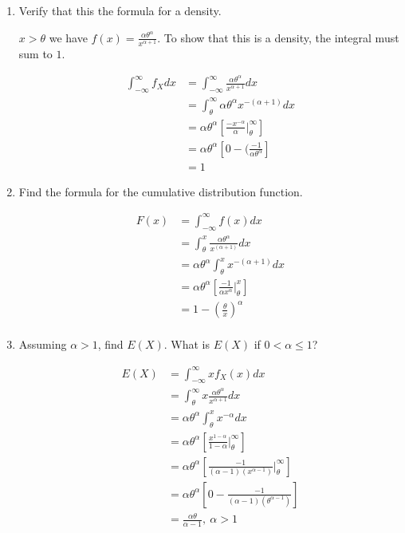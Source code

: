 \documentclass{tufte-book}
\theoremstyle{mytheoremstyle}
\theoremstyle{mylemstyle}
\theoremstyle{mydefstyle}
\begin{document}
\begin{enumerate}
\item Verify that this the formula for a density.

 $x > \theta$ we have $f(x)= \frac{\alpha\theta^{\alpha}}{x^{\alpha+1}}$.  To show that this is a density, the integral must sum to $1$.

\begin{align*}
\int_{-\infty}^\infty f_Xdx &= \int_{-\infty}^\infty \frac{\alpha\theta^{\alpha}}{x^{\alpha+1}}dx\\
&= \int_\theta^\infty \alpha\theta^{\alpha}x^{-(\alpha+1)}dx\\
&= \alpha\theta^\alpha[ \frac{-x^{-\alpha}}{\alpha}\Big|_\theta^\infty]\\
&= \alpha\theta^\alpha[0-(\frac{-1}{\alpha\theta^{\alpha}}]\\
&= 1
\end{align*}

\item Find the formula for the cumulative distribution function.

\begin{align*}
F(x) &= \int_{-\infty}^\infty f(x)dx\\
&= \int_\theta^x \frac{\alpha\theta^{\alpha}}{x^{(\alpha+1)}}dx\\
&= \alpha\theta^\alpha \int_\theta^x x^{-(\alpha+1)}dx\\
&= \alpha\theta^\alpha [\frac{-1}{\alpha x^\alpha}\Big|_\theta^x]\\
&= 1 - (\frac{\theta}{x})^\alpha\\
\end{align*}
\item Assuming $\alpha > 1$, find $E(X)$.  What is $E(X)$ if $0 < \alpha \leq 1$?

\begin{align*}
E(X) &= \int_{-\infty}^{\infty} xf_X(x)dx\\
&= \int_\theta^\infty x\frac{\alpha\theta^{\alpha}}{x^{\alpha+1}}dx\\
&= \alpha\theta^\alpha \int_\theta^x x^{-\alpha}dx\\
&= \alpha\theta^\alpha [\frac{x^{1-\alpha}}{1-\alpha}\Big|_\theta^\infty]\\
&= \alpha\theta^\alpha [ \frac{-1}{(\alpha-1)(x^{\alpha-1})}\Big|_\theta^\infty]\\
&= \alpha\theta^\alpha[0-\frac{-1}{(\alpha-1)(\theta^{\alpha-1})}]\\
&= \frac{\alpha\theta}{\alpha-1} ,\ \alpha > 1\\
\end{align*}


\end{enumerate}
\end{document}
